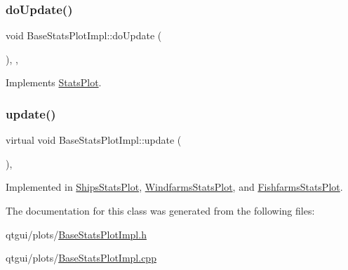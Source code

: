 \mbox{\label{class_base_stats_plot_impl_a10523764ddeab4cc171b05daf3e7acaf}} 
\subsubsection{\texorpdfstring{doUpdate()}{doUpdate()}}
{\footnotesize\ttfamily void Base\+Stats\+Plot\+Impl\+::do\+Update (\begin{DoxyParamCaption}{ }\end{DoxyParamCaption})\hspace{0.3cm}{\ttfamily [override]}, {\ttfamily [protected]}, {\ttfamily [virtual]}}



Implements \mbox{\hyperlink{class_stats_plot_a363a428cc00b389a55a03e6d5d7c526e}{Stats\+Plot}}.

\mbox{\label{class_base_stats_plot_impl_aa483fe8053767302195bb82bf9a3d7fb}} 
\subsubsection{\texorpdfstring{update()}{update()}}
{\footnotesize\ttfamily virtual void Base\+Stats\+Plot\+Impl\+::update (\begin{DoxyParamCaption}\item[{\mbox{\hyperlink{class_q_custom_plot}{Q\+Custom\+Plot}} $\ast$}]{ }\end{DoxyParamCaption})\hspace{0.3cm}{\ttfamily [protected]}, {}}



Implemented in \mbox{\hyperlink{class_ships_stats_plot_a1e9a41757c9d114a939318d7582c060c}{Ships\+Stats\+Plot}}, \mbox{\hyperlink{class_windfarms_stats_plot_ac92ec0f10052bb5322de99ddf595468b}{Windfarms\+Stats\+Plot}}, and \mbox{\hyperlink{class_fishfarms_stats_plot_ae089d568ff8a9936fb9b5c9d2e3f6ee1}{Fishfarms\+Stats\+Plot}}.



The documentation for this class was generated from the following files\+:\begin{DoxyCompactItemize}
\item 
qtgui/plots/\mbox{\hyperlink{_base_stats_plot_impl_8h}{Base\+Stats\+Plot\+Impl.\+h}}\item 
qtgui/plots/\mbox{\hyperlink{_base_stats_plot_impl_8cpp}{Base\+Stats\+Plot\+Impl.\+cpp}}\end{DoxyCompactItemize}
